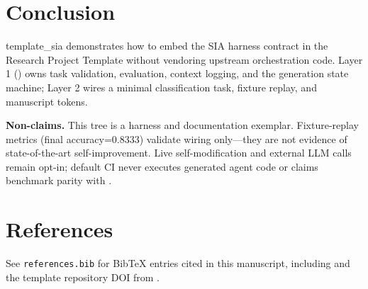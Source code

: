 \documentclass[
  english,
]{article}
\begin{document}
\section{Conclusion}\label{sec:conclusion}

template\_sia demonstrates how to embed the SIA harness contract in the
Research Project Template without vendoring upstream orchestration code.
Layer 1 () owns task validation, evaluation,
context logging, and the generation state machine; Layer 2 wires a
minimal classification task, fixture replay, and manuscript tokens.

\textbf{Non-claims.} This tree is a harness and documentation exemplar.
Fixture-replay metrics (final accuracy=0.8333) validate wiring
only---they are not evidence of state-of-the-art self-improvement. Live
self-modification and external LLM calls remain opt-in; default CI never
executes generated agent code or claims benchmark parity with
\citep{sia2026}.

\newpage

\section{References}\label{sec:references}

See \texttt{references.bib} for BibTeX entries cited in this manuscript,
including \citep{sia2026} and the template repository DOI from
.



\clearpage


\end{document}
